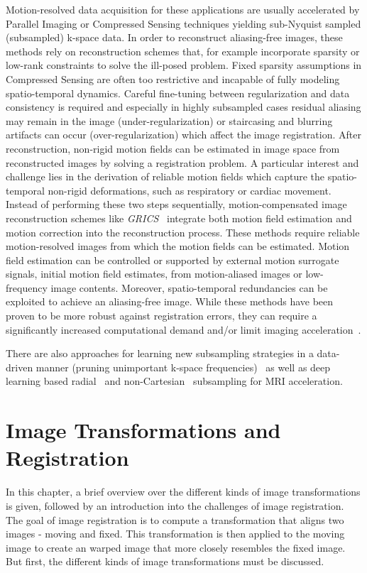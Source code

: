 \documentclass[english,version-2022-01]{uzl-thesis} %
\begin{document}
Motion-resolved data acquisition for these applications are usually accelerated by Parallel Imaging or Compressed Sensing techniques yielding sub-Nyquist sampled (subsampled) k-space data. In order to reconstruct aliasing-free images, these methods rely on reconstruction schemes that, for example incorporate sparsity or low-rank constraints to solve the ill-posed problem. Fixed sparsity assumptions in Compressed Sensing are often too restrictive and incapable of fully modeling spatio-temporal dynamics. Careful fine-tuning between regularization and data consistency is required and especially in highly subsampled cases residual aliasing may remain in the image (under-regularization) or staircasing and blurring artifacts can occur (over-regularization) which affect the image registration. After reconstruction, non-rigid motion fields can be estimated in image space from reconstructed images by solving a registration problem. A particular interest and challenge lies in the derivation of reliable motion fields which capture the spatio-temporal non-rigid deformations, such as respiratory or cardiac movement. Instead of performing these two steps sequentially, motion-compensated image reconstruction schemes like \emph{GRICS}~\cite{GRICS} integrate both motion field estimation and motion correction into the reconstruction process. These methods require reliable motion-resolved images from which the motion fields can be estimated. Motion field estimation can be controlled or supported by external motion surrogate signals, initial motion field estimates, from motion-aliased images or low-frequency image contents. Moreover, spatio-temporal redundancies can be exploited to achieve an aliasing-free image. While these methods have been proven to be more robust against registration errors, they can require a significantly increased computational demand and/or limit imaging acceleration~\cite{Kuestner2022}.

There are also approaches for learning new subsampling strategies in a data-driven manner (pruning unimportant k-space frequencies)~\cite{MRISubsamplingPruning} as well as deep learning based radial~\cite{DeepMRIReconstructionRadialSubsampling} and non-Cartesian~\cite{DeepMRIReconstructionSubsampling} subsampling for MRI acceleration.

\chapter{Image Transformations and Registration} \label{Ch:ImageTransformationsAndRegistration}
In this chapter, a brief overview over the different kinds of image transformations is given, followed by an introduction into the challenges of image registration.\\
The goal of image registration is to compute a transformation that aligns two images - moving and fixed. This transformation is then applied to the moving image to create an warped image that more closely resembles the fixed image. But first, the different kinds of image transformations must be discussed.
\end{document}
